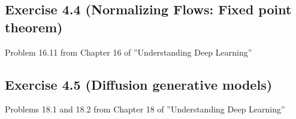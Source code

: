 \documentclass[
10pt, %
a4paper, %
oneside, %
headinclude,footinclude, %
BCOR5mm, %
]{scrartcl}
\begin{document}
\subsection*{Exercise 4.4 (Normalizing Flows: Fixed point theorem)}
Problem 16.11 from Chapter 16 of ”Understanding Deep Learning”

\subsection*{Exercise 4.5 (Diffusion generative models)}
Problems 18.1 and 18.2 from Chapter 18 of ”Understanding Deep Learning”


\end{document}
